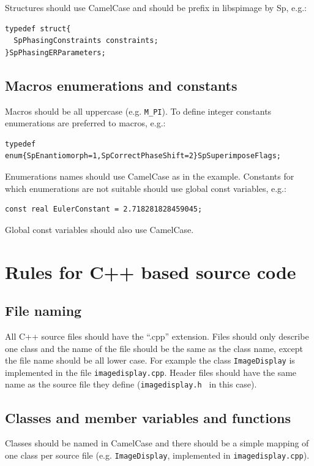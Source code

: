 \documentclass[12pt]{article}
\newenvironment{sourcestyle}{}{}%
\begin{document}
Structures should use CamelCase and should be prefix in libspimage by Sp, e.g.:
\begin{sourcestyle}
\begin{verbatim}
typedef struct{
  SpPhasingConstraints constraints;
}SpPhasingERParameters;
\end{verbatim}
\end{sourcestyle}

\subsection{Macros enumerations and constants}
Macros should be all uppercase (e.g. {\tt M\_PI}). To define integer constants enumerations are preferred to macros, e.g.:
\begin{sourcestyle}
\begin{verbatim}
typedef enum{SpEnantiomorph=1,SpCorrectPhaseShift=2}SpSuperimposeFlags;
\end{verbatim}
\end{sourcestyle}
Enumerations names should use CamelCase as in the example. Constants for which enumerations are not suitable should use global const variables, e.g.:
\begin{sourcestyle}
\begin{verbatim}
const real EulerConstant = 2.718281828459045;
\end{verbatim}
\end{sourcestyle}
Global const variables should also use CamelCase.

\section{Rules for C++ based source code}
\subsection{File naming}
All C++ source files should have the ``.cpp'' extension. Files should only describe 
one class and the name of the file should be the same as the class name, except the file
name should be all lower case. For example the class {\tt ImageDisplay} is implemented in the file {\tt imagedisplay.cpp}. Header files should have the same name as the source file they define ({\tt imagedisplay.h } in this case).

\subsection{Classes and member variables and functions}
Classes should be named in CamelCase and there should be a simple mapping 
of one class per source file (e.g. {\tt ImageDisplay}, implemented in {\tt imagedisplay.cpp}).
\end{document}
